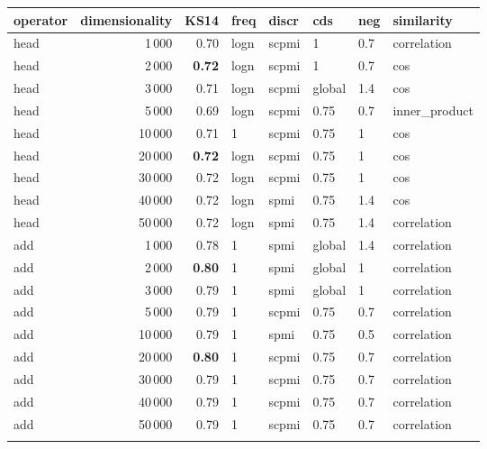 \begin{tabular}{lrrlllll}
\toprule
operator &  dimensionality &  KS14 &  freq &  discr &     cds &  neg &     similarity \\
\midrule
    head &            1\,000 &  0.70 &  logn &  scpmi &       1 &  0.7 &    correlation \\
    head &            2\,000 &  \textbf{0.72} &  logn &  scpmi &       1 &  0.7 &            cos \\
    head &            3\,000 &  0.71 &  logn &  scpmi &  global &  1.4 &            cos \\
    head &            5\,000 &  0.69 &  logn &  scpmi &    0.75 &  0.7 &  inner\_product \\
    head &           10\,000 &  0.71 &     1 &  scpmi &    0.75 &    1 &            cos \\
    head &           20\,000 &  \textbf{0.72} &  logn &  scpmi &    0.75 &    1 &            cos \\
    head &           30\,000 &  0.72 &  logn &  scpmi &    0.75 &    1 &            cos \\
    head &           40\,000 &  0.72 &  logn &   spmi &    0.75 &  1.4 &            cos \\
    head &           50\,000 &  0.72 &  logn &   spmi &    0.75 &  1.4 &    correlation \\ \addlinespace
     add &            1\,000 &  0.78 &     1 &   spmi &  global &  1.4 &    correlation \\
     add &            2\,000 &  \textbf{0.80} &     1 &   spmi &  global &    1 &    correlation \\
     add &            3\,000 &  0.79 &     1 &   spmi &  global &    1 &    correlation \\
     add &            5\,000 &  0.79 &     1 &  scpmi &    0.75 &  0.7 &    correlation \\
     add &           10\,000 &  0.79 &     1 &   spmi &    0.75 &  0.5 &    correlation \\
     add &           20\,000 &  \textbf{0.80} &     1 &  scpmi &    0.75 &  0.7 &    correlation \\
     add &           30\,000 &  0.79 &     1 &  scpmi &    0.75 &  0.7 &    correlation \\
     add &           40\,000 &  0.79 &     1 &  scpmi &    0.75 &  0.7 &    correlation \\
     add &           50\,000 &  0.79 &     1 &  scpmi &    0.75 &  0.7 &    correlation \\ \addlinespace

\end{tabular}

